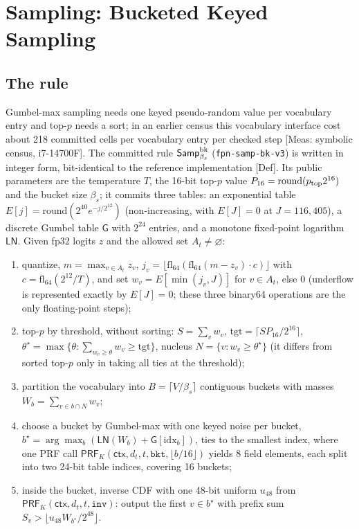 \documentclass[10pt]{article}
\begin{document}
\section{Sampling: Bucketed Keyed Sampling}
\subsection{The rule}
Gumbel-max sampling needs one keyed pseudo-random value per vocabulary entry and top-$p$ needs a sort; in an earlier census this vocabulary interface cost about 218 committed cells per vocabulary entry per checked step [Meas: symbolic census, i7-14700F]. The committed rule $\mathsf{Samp}^{\rm bk}_{\beta_s}$ (\texttt{fpn-samp-bk-v3}) is written in integer form, bit-identical to the reference implementation [Def]. Its public parameters are the temperature $T$, the 16-bit top-$p$ value $P_{16}=\mathrm{round}(p_{\rm top}2^{16})$ and the bucket size $\beta_s$; it commits three tables: an exponential table $E[j]=\mathrm{round}(2^{40}e^{-j/2^{12}})$ (non-increasing, with $E[J]=0$ at $J=116{,}405$), a discrete Gumbel table $\mathsf G$ with $2^{24}$ entries, and a monotone fixed-point logarithm $\mathsf{LN}$. Given fp32 logits $z$ and the allowed set $A_t\neq\varnothing$:

\begin{enumerate}
\item{} quantize, $m=\max_{v\in A_t}z_v$, $j_v=\lfloor\mathrm{fl}_{64}(\mathrm{fl}_{64}(m-z_v)\cdot c)\rfloor$ with $c=\mathrm{fl}_{64}(2^{12}/T)$, and set $w_v=E[\min(j_v,J)]$ for $v\in A_t$, else 0 (underflow is represented exactly by $E[J]=0$; these three binary64 operations are the only floating-point steps);
\item{} top-$p$ by threshold, without sorting: $S=\sum_vw_v$, $\mathrm{tgt}=\lceil SP_{16}/2^{16}\rceil$, $\theta^\star=\max\{\theta:\sum_{w_v\ge\theta}w_v\ge\mathrm{tgt}\}$, nucleus $N=\{v:w_v\ge\theta^\star\}$ (it differs from sorted top-$p$ only in taking all ties at the threshold);
\item{} partition the vocabulary into $B=\lceil V/\beta_s\rceil$ contiguous buckets with masses $W_b=\sum_{v\in b\cap N}w_v$;
\item{} choose a bucket by Gumbel-max with one keyed noise per bucket, $b^\star=\arg\max_b(\mathsf{LN}(W_b)+\mathsf G[\mathrm{idx}_b])$, ties to the smallest index, where one PRF call $\mathsf{PRF}_K(\mathsf{ctx},d_t,t,\texttt{bkt},\lfloor b/16\rfloor)$ yields 8 field elements, each split into two 24-bit table indices, covering 16 buckets;
\item{} inside the bucket, inverse CDF with one 48-bit uniform $u_{48}$ from $\mathsf{PRF}_K(\mathsf{ctx},d_t,t,\texttt{inv})$: output the first $v\in b^\star$ with prefix sum $S_v>\lfloor u_{48}W_{b^\star}/2^{48}\rfloor$.
\end{enumerate}
\end{document}
